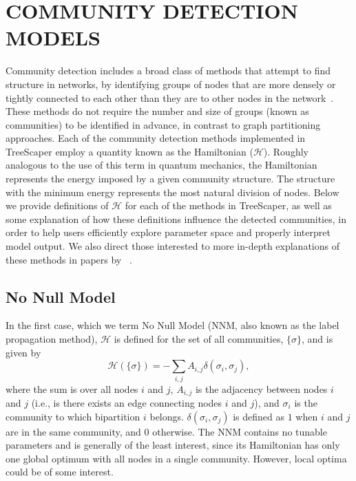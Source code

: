 \documentclass[11pt]{article}
\begin{document}
\newpage
\appendix
\section{COMMUNITY DETECTION MODELS}\label{appendix:CDModels}

Community detection includes a broad class of methods that attempt to find structure in
networks, by identifying groups of nodes that are more densely or tightly connected to each
other than they are to other nodes in the network~\citep{Newman:2010}. These methods do not
require the number and size of groups (known as communities) to be identified in advance,
in contrast to graph partitioning approaches. Each of the community detection methods
implemented in TreeScaper employ a quantity known as the Hamiltonian ($\mathcal{H}$). Roughly
analogous to the use of this term in quantum mechanics, the Hamiltonian represents the
energy imposed by a given community structure. The structure with the minimum energy
represents the most natural division of nodes. Below we provide definitions of $\mathcal{H}$ for each of the methods in TreeScaper, as well as some explanation of how these definitions influence the
detected communities, in order to help users efficiently explore parameter space and properly
interpret model output. We also direct those interested to more in-depth explanations of
these methods in papers by ~\citealp{Fortunato:2010,RB:2006,RAK:2007,TB:2009,TVDN:2011,Traag:2014}. \\

\subsection{No Null Model}\label{appendix:NoNullModel}
In the first case, which we term No Null Model (NNM, also known as the label propagation
method), $\mathcal{H}$ is defined for the set of all communities, $\{\sigma\}$, and is given by
\begin{equation}\label{eq:NoNullModel}
\mathcal{H}(\{\sigma\}) = - \displaystyle\sum_{i,j} A_{i,j} \delta(\sigma_{i}, \sigma_{j}),
\end{equation}
where the sum is over all nodes $i$ and $j$, $A_{i,j}$ is the adjacency between nodes $i$ and $j$ (i.e., is there exists an edge connecting nodes $i$ and $j$), and $\sigma_{i}$ is the community to which bipartition $i$ belongs. $\delta(\sigma_{i}, \sigma_{j})$ is defined as $1$ when $i$ and $j$ are in the same community, and $0$ otherwise. The NNM contains no tunable parameters and is generally of the least interest, since its Hamiltonian has only one global optimum with all nodes in a single community. However, local optima could be of some interest. \\
\end{document}
